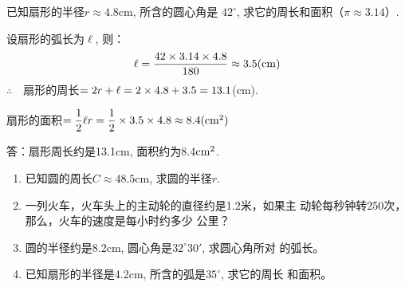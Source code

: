 \begin{example}
    已知扇形的半径$r\approx 4.8$cm, 所含的圆心角是
$42^{\circ}$, 求它的周长和面积（$\pi \approx 3.14$）.
\end{example}

\begin{solution}
    设扇形的弧长为$\ell$, 则：
    \[\ell=\dfrac{42\times3.14\times4.8}{180}\approx 3.5({\rm cm})\]
$\therefore\quad $扇形的周长$=2r+\ell=2\times4.8+3.5=13.1$(cm).

扇形的面积$=\dfrac{1}{2}\ell r=\dfrac{1}{2}\times3.5\times4.8\approx 8.4({\rm cm^2})$

答：扇形周长约是13.1cm, 面积约为8.4${\rm cm^2}$.
\end{solution}

\begin{ex}
\begin{enumerate}
\item 已知圆的周长$C\approx 48.5$cm, 求圆的半径$r$.
\item 一列火车，火车头上的主动轮的直径约是1.2米，如果主
动轮每秒钟转250次，那么，火车的速度是每小时约多少
公里？
\item 圆的半径约是8.2cm, 圆心角是$32^{\circ}30'$, 求圆心角所对
的弧长。
\item 已知扇形的半径是4.2cm, 所含的弧是$35^{\circ}$, 求它的周长
和面积。
\end{enumerate}
\end{ex}

